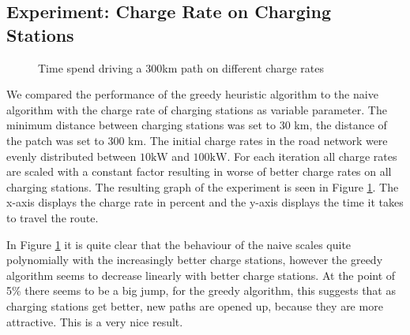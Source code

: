 \subsection{Experiment: Charge Rate on Charging Stations}

\begin{figure}
\centering
{}
\caption{Time spend driving a 300km path on different charge rates} 
\label{fig:charge_rate}
\end{figure}

We compared the performance of the greedy heuristic algorithm to the naive algorithm with the charge rate of charging stations as variable parameter. The minimum distance between charging stations was set to 30 km, the distance of the patch was set to 300 km. The initial charge rates in the road network were evenly distributed between $10 \si{\kW}$ and $100 \si{\kW}$. For each iteration all charge rates are scaled with a constant factor resulting in worse of better charge rates on all charging stations. The resulting graph of the experiment is seen in Figure \ref{fig:charge_rate}. The x-axis displays the charge rate in percent and the y-axis displays the time it takes to travel the route.

In Figure \ref{fig:charge_rate} it is quite clear that the behaviour of the naive scales quite polynomially with the increasingly better charge stations, however the greedy algorithm seems to decrease linearly with better charge stations. At the point of 5\% there seems to be a big jump, for the greedy algorithm, this suggests that as charging stations get better, new paths are opened up, because they are more attractive. This is a very nice result. 